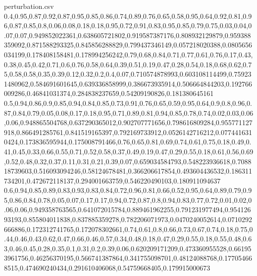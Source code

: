 \documentclass{llncs}
\begin{document}
\begin{filecontents*}{perturbation.csv}
	0.4,0.95,0.87,0.92,0.87,0.95,0.85,0.86,0.74,0.89,0.76,0.65,0.58,0.95,0.64,0.92,0.81,0.96,0.87,0.85,0.8,0.06,0.08,0.18,0.18,0.95,0.72,0.91,0.83,0.95,0.85,0.79,0.75,0.03,0.04,0.07,0.07,0.949852022361,0.638605721802,0.919587387176,0.808932129879,0.959388359092,0.871588293325,0.845856288829,0.799437346149,0.057218020388,0.0805656034199,0.178408158481,0.178994256242,0.79,0.68,0.84,0.71,0.77,0.61,0.76,0.17,0.43,0.38,0.45,0.42,0.71,0.6,0.76,0.58,0.64,0.39,0.51,0.19,0.47,0.28,0.54,0.18,0.68,0.62,0.75,0.58,0.58,0.35,0.39,0.12,0.32,0.2,0.4,0.07,0.710574878993,0.603108114499,0.759231480962,0.584691601645,0.639336858999,0.386673935914,0.506664844203,0.192766009286,0.46841031374,0.284838237659,0.54209190826,0.181380645161
	0.5,0.94,0.86,0.9,0.85,0.94,0.84,0.85,0.73,0.91,0.76,0.65,0.59,0.95,0.64,0.9,0.8,0.96,0.87,0.84,0.79,0.05,0.08,0.17,0.18,0.95,0.71,0.89,0.81,0.94,0.85,0.78,0.74,0.02,0.03,0.06,0.06,0.948865504768,0.637290365012,0.902707771656,0.798616809284,0.955771127918,0.866491285761,0.841519165397,0.792169733912,0.0526142716212,0.0774416310424,0.173836595944,0.175008791466,0.76,0.65,0.81,0.69,0.74,0.61,0.75,0.18,0.49,0.41,0.45,0.33,0.66,0.55,0.71,0.52,0.58,0.37,0.49,0.19,0.47,0.29,0.55,0.18,0.61,0.56,0.69,0.52,0.48,0.32,0.37,0.11,0.31,0.21,0.39,0.07,0.659034584793,0.548223936618,0.708818739603,0.516093094246,0.58124678481,0.366206617854,0.493604436532,0.186311734201,0.472672118137,0.294001663759,0.546220490103,0.180911094637
	0.6,0.94,0.85,0.89,0.83,0.93,0.83,0.84,0.72,0.96,0.81,0.66,0.52,0.95,0.64,0.89,0.79,0.95,0.86,0.84,0.78,0.05,0.07,0.17,0.17,0.94,0.72,0.87,0.8,0.94,0.83,0.77,0.72,0.01,0.02,0.06,0.06,0.949358763565,0.641072015784,0.889461962255,0.791231977494,0.95412693193,0.855804011838,0.837885359278,0.782206071973,0.0470240052614,0.0710292666886,0.172312741765,0.172078302661,0.74,0.61,0.8,0.66,0.73,0.67,0.74,0.18,0.75,0.44,0.46,0.43,0.62,0.47,0.66,0.46,0.57,0.34,0.48,0.18,0.47,0.29,0.55,0.18,0.55,0.48,0.63,0.46,0.45,0.28,0.35,0.1,0.31,0.2,0.39,0.06,0.620209171209,0.473360955528,0.661953961756,0.46256370195,0.566741387864,0.341755098701,0.48124088768,0.177054668515,0.474690240434,0.291610406068,0.54759668405,0.179915000673
\end{filecontents*}
\end{document}
